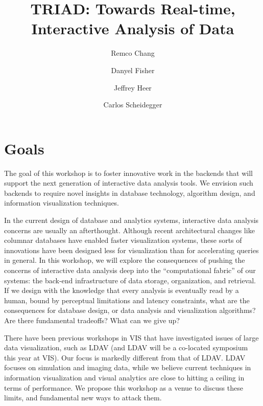 \documentclass[journal]{vgtc}                %
\title{TRIAD: Towards Real-time, Interactive Analysis of Data}
\author{Remco Chang \and Danyel Fisher \and Jeffrey Heer \and Carlos Scheidegger}
\begin{document}
\maketitle
\section{Goals}
The goal of this workshop is to foster innovative work in the backends
that will support the next generation of interactive data analysis
tools. We envision such backends to require novel insights in database
technology, algorithm design, and information visualization techniques.

In the current design of database and analytics systems, interactive
data analysis concerns are usually an afterthought. Although recent
architectural changes like columnar databases have enabled faster
visualization systems, these sorts of innovations have been designed
less for visualization than for accelerating queries in general. In
this workshop, we will explore the consequences of pushing the
concerns of interactive data analysis deep into the ``computational
fabric'' of our systems: the back-end infrastructure of data storage,
organization, and retrieval. If we design with the knowledge that
every analysis is eventually read by a human, bound by perceptual
limitations and latency constraints, what are the consequences for
database design, or data analysis and visualization algorithms? Are
there fundamental tradeoffs? What can we give up?

There have been previous workshops in VIS that have investigated
issues of large data visualization, such as LDAV (and LDAV will be a
co-located symposium this year at VIS). Our focus is markedly
different from that of LDAV. LDAV focuses on simulation and imaging
data, while we believe current techniques in information visualization
and visual analytics are close to hitting a ceiling in terms of
performance. We propose this workshop as a venue to discuss these
limits, and fundamental new ways to attack them.
\end{document}
